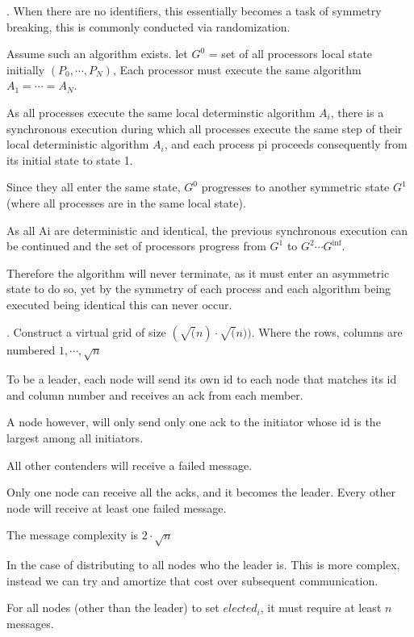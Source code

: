 \documentclass[12pt]{article}
\newcounter{question}
\newcommand{\question}[1]{
    \stepcounter{question}
    \thequestion. #1 \hfill
}
\begin{document}
\question{When there are no identifiers, this essentially becomes a task of symmetry breaking, this is commonly
    conducted via randomization.

    Assume such an algorithm exists.
    let $G^0$ = set of all processors local state initially $(P_0,\cdots,P_N)$, Each processor must execute the same algorithm $A_1 = \cdots = A_N$.

    As all processes execute the same local determinstic algorithm $A_i$, there is a synchronous execution during which all processes
    execute the same step of their local deterministic algorithm $A_i$, and each process pi proceeds consequently from its initial state
    to state 1.

    Since they all enter the same state, $G^0$ progresses to another symmetric state $G^1$ (where all processes are in the same local state).

    As all Ai are deterministic and identical, the previous synchronous execution can be continued and the set of processors progress
    from $G^1$ to $G^2 \cdots G^{\inf}$.

    Therefore the algorithm will never terminate, as it must enter an asymmetric state to do so, yet by the symmetry of each process
    and each algorithm being executed being identical this can never occur.
}

\question{Construct a virtual grid of size $(\sqrt(n) \cdot \sqrt(n))$. Where the rows, columns are numbered $1, \cdots, \sqrt n$

    To be a leader, each node will send its own id to each node
    that matches its id and column number and receives an ack from
    each member.

    A node however, will only send only one ack to the initiator whose
    id is the largest among all initiators.

    All other contenders will receive a failed message.

    Only one node can receive all the acks, and it becomes the leader. Every other node will receive
    at least one failed message.


    The message complexity is $2 \cdot \sqrt n$

    In the case of distributing to all nodes who the leader is. This is more complex,
    instead we can try and amortize that cost over subsequent communication.

    For all nodes (other than the leader) to set $elected_i$, it must require at least $n$ messages.

}
\end{document}
